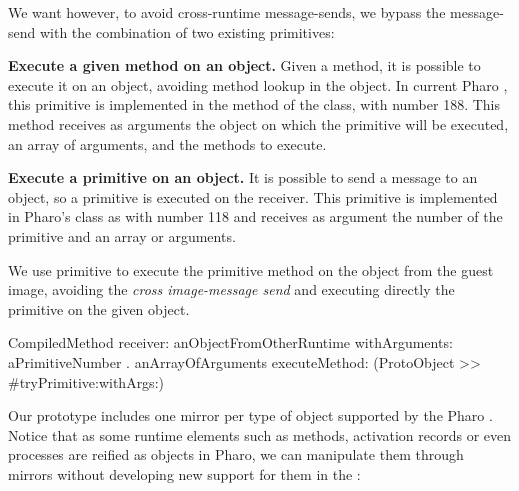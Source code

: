 We want however, to avoid cross-runtime message-sends, we bypass the message-send with the combination of two existing primitives:
\begin{description}
	\item \textbf{Execute a given method on an object.} Given a method, it is possible to execute it on an object, avoiding method lookup in the object. In current Pharo \VM, this primitive is implemented in the method \textbf{} of the  class, with number 188. This method receives as arguments the object on which the primitive will be executed, an array of arguments, and the methods to execute.
	\item \textbf{Execute a primitive on an object.} It is possible to send a message to an object, so a primitive is executed on the receiver. This primitive is implemented in Pharo's  class as \textbf{} with number 118 and receives as argument the number of the primitive and an array or arguments.
\end{description}

We use primitive  to execute the primitive method  on the object from the guest image, avoiding the \emph{cross image-message send} and executing directly the primitive on the given object.

\begin{code}
CompiledMethod
       receiver: anObjectFromOtherRuntime
       withArguments: { aPrimitiveNumber . anArrayOfArguments }
       executeMethod: (ProtoObject >> #tryPrimitive:withArgs:)
\end{code}

Our \Vtt prototype includes one mirror per type of object supported by the Pharo \VM. Notice that as some runtime elements such as methods, activation records or even processes are reified as objects in Pharo, we can manipulate them through mirrors without developing new support for them in the \VM:


